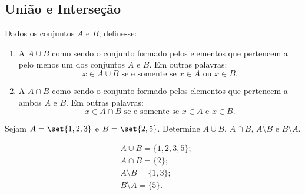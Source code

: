 \subsection{União e Interseção}

\begin{definition}
Dados os conjuntos $A$ e $B$, define-se:

\begin{enumerate}
	\item A  $A \cup B$ como sendo o conjunto formado pelos elementos que pertencem a pelo menos um dos conjuntos $A$ e $B$. Em outras palavras:
		$$ x \in A \cup B \text{ se e somente se } x \in A \text{ ou } x \in B. $$
	\item A  $A \cap B$ como sendo o conjunto formado pelos elementos que pertencem a ambos $A$ e $B$. Em outras palavras:
		$$ x \in A \cap B \text{ se e somente se } x \in A \text{ e } x \in B. $$
\end{enumerate}
\end{definition}

\begin{example}
Sejam $A = \set{1, 2, 3}$ e $ B = \set{2,5}$. Determine $A \cup B$, $A \cap B$, $A \setminus B$ e $B \setminus A$.
\end{example}

\begin{solution}
\begin{align*}
	&A \cup B = \{1,2,3,5\};\\
	&A \cap B = \{2\};\\
	&A \setminus B = \{1,3\};\\
	&B \setminus A = \{5\}.
\end{align*}
\end{solution}


